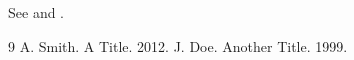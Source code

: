 \documentclass{acmcite}
\begin{document}
See \cite{a,b} and .
\begin{thebibliography}{9}
 A. Smith. A Title. 2012.
 J. Doe. Another Title. 1999.
\end{thebibliography}
\end{document}
